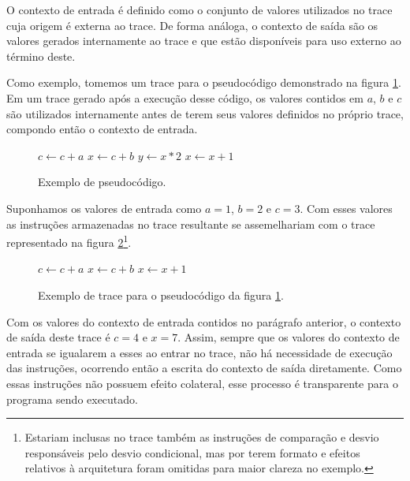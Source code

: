 O contexto de entrada é definido como o conjunto de valores utilizados no trace cuja origem é externa ao trace. De forma análoga, o contexto de saída são os valores gerados internamente ao trace e que estão disponíveis para uso externo ao término deste.

Como exemplo, tomemos um trace para o pseudocódigo demonstrado na figura \ref{Fig:ExemploContexto1}. Em um trace gerado após a execução desse código, os valores contidos em $a$, $b$ e $c$ são utilizados internamente antes de terem seus valores definidos no próprio trace, compondo então o contexto de entrada.

\begin{figure}[!h]
	\label{Fig:ExemploContexto1}
	\caption[Exemplo de pseudocódigo]{
		Exemplo de pseudocódigo.}
	
		\begin{algorithmic}
			\STATE $c \leftarrow c + a$
			\STATE $x \leftarrow c + b$
			\STATE $y \leftarrow x * 2$
			\ELSE
			\STATE $x \leftarrow x + 1$
			\ENDIF
		\end{algorithmic}
	\legend{Fonte: elaborada pelo autor}
\end{figure}

Suponhamos os valores de entrada como $a = 1$, $b = 2$ e $c = 3$. Com esses valores as instruções armazenadas no trace resultante se assemelhariam com o trace representado na figura \ref{Fig:ExemploContexto2}\footnote{Estariam inclusas no trace também as instruções de comparação e desvio responsáveis pelo desvio condicional, mas por terem formato e efeitos relativos à arquitetura foram omitidas para maior clareza no exemplo.}. 

\begin{figure}[!h]
	\label{Fig:ExemploContexto2}
	\caption[Exemplo de trace para o pseudocódigo da figura \ref{Fig:ExemploContexto1}]{
		Exemplo de trace para o pseudocódigo da figura \ref{Fig:ExemploContexto1}.}
	
	\begin{algorithmic}
		\STATE $c \leftarrow c + a$
		\STATE $x \leftarrow c + b$
		\STATE $x \leftarrow x + 1$
	\end{algorithmic}
\end{figure}

Com os valores do contexto de entrada contidos no parágrafo anterior, o contexto de saída deste trace é $c = 4$ e $x = 7$. Assim, sempre que os valores do contexto de entrada se igualarem a esses ao entrar no trace, não há necessidade de execução das instruções, ocorrendo então a escrita do contexto de saída diretamente. Como essas instruções não possuem efeito colateral, esse processo é transparente para o programa sendo executado.

